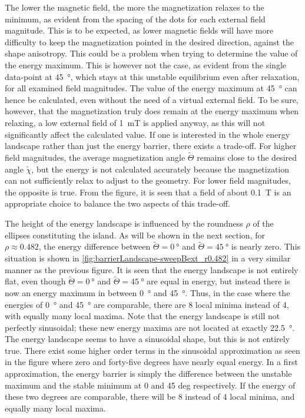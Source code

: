 \documentclass[11pt,a4paper,english]{article}
\begin{document}
The lower the magnetic field, the more the magnetization relaxes to the minimum, as evident from the spacing of the dots for each external field magnitude. This is to be expected, as lower magnetic fields will have more difficulty to keep the magnetization pointed in the desired direction, against the shape anisotropy. This could be a problem when trying to determine the value of the energy maximum. This is however not the case, as evident from the single data-point at \SI{45}{\degree}, which stays at this unstable equilibrium even after relaxation, for all examined field magnitudes. The value of the energy maximum at \SI{45}{\degree} can hence be calculated, even without the need of a virtual external field. To be sure, however, that the magnetization truly does remain at the energy maximum when relaxing, a low external field of \SI{1}{\milli\tesla} is applied anyway, as this will not significantly affect the calculated value. If one is interested in the whole energy landscape rather than just the energy barrier, there exists a trade-off. For higher field magnitudes, the average magnetization angle $\widetilde{\Theta}$ remains close to the desired angle $\widetilde{\chi}$, but the energy is not calculated accurately because the magnetization can not sufficiently relax to adjust to the geometry. For lower field magnitudes, the opposite is true. From the figure, it is seen that a field of about \SI{0.1}{\tesla} is an appropriate choice to balance the two aspects of this trade-off. \par
The height of the energy landscape is influenced by the roundness $\rho$ of the ellipses constituting the island. As will be shown in the next section, for $\rho \approx 0.482$, the energy difference between $\widetilde{\Theta} = \SI{0}{\degree}$ and $\widetilde{\Theta} = \SI{45}{\degree}$ is nearly zero. This situation is shown in \cref{fig:barrierLandscape-sweepBext_r0.482} in a very similar manner as the previous figure. It is seen that the energy landscape is not entirely flat, even though $\widetilde{\Theta} = \SI{0}{\degree}$ and $\widetilde{\Theta} = \SI{45}{\degree}$ are equal in energy, but instead there is now an energy maximum in between \SI{0}{\degree} and \SI{45}{\degree}. Thus, in the case where the energies of \SI{0}{\degree} and \SI{45}{\degree} are comparable, there are 8 local minima instead of 4, with equally many local maxima. Note that the energy landscape is still not perfectly sinusoidal; these new energy maxima are not located at exactly \SI{22.5}{\degree}.
The energy landscape seems to have a sinusoidal shape, but this is not entirely true. There exist some higher order terms in the sinusoidal approximation as seen in the figure where zero and forty-five degrees have nearly equal energy.
In a first approximation, the energy barrier is simply the difference between the unstable maximum and the stable minimum at 0 and 45 deg respectively. If the energy of these two degrees are comparable, there will be 8 instead of 4 local minima, and equally many local maxima.
\end{document}
